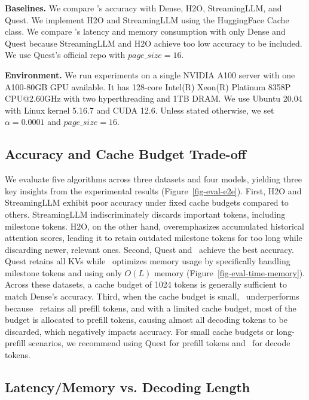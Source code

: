\textbf{Baselines.} We compare \algo's accuracy with Dense, H2O, StreamingLLM, and Quest. We implement H2O and StreamingLLM using the HuggingFace Cache class. We compare \algo's latency and memory consumption with only Dense and Quest because StreamingLLM and H2O achieve too low accuracy to be included. We use Quest's official repo with $page\_size=16$.


\textbf{Environment.} We run experiments on a single NVIDIA A100 server with one A100-80GB GPU available. It has 128-core Intel(R) Xeon(R) Platinum 8358P CPU@2.60GHz with two hyperthreading and 1TB DRAM. We use Ubuntu 20.04 with Linux kernel 5.16.7 and CUDA 12.6. Unless stated otherwise, we set $\alpha=0.0001$ and $page\_size=16$.

\subsection{Accuracy and Cache Budget Trade-off}




We evaluate five algorithms across three datasets and four models, yielding three key insights from the experimental results (Figure~\ref{fig-eval-e2e}). First, H2O and StreamingLLM exhibit poor accuracy under fixed cache budgets compared to others. StreamingLLM indiscriminately discards important tokens, including milestone tokens. H2O, on the other hand, overemphasizes accumulated historical attention scores, leading it to retain outdated milestone tokens for too long while discarding newer, relevant ones. Second, Quest and \algo\ achieve the best accuracy. Quest retains all KVs while \algo\ optimizes memory usage by specifically handling milestone tokens and using only $O(L)$ memory (Figure~\ref{fig-eval-time-memory}). Across these datasets, a cache budget of 1024 tokens is generally sufficient to match Dense’s accuracy. Third, when the cache budget is small, \algo\ underperforms because \algo\ retains all prefill tokens, and with a limited cache budget, most of the budget is allocated to prefill tokens, causing almost all decoding tokens to be discarded, which negatively impacts accuracy. For small cache budgets or long-prefill scenarios, we recommend using Quest for prefill tokens and \algo\ for decode tokens.

\subsection{Latency/Memory vs. Decoding Length}



